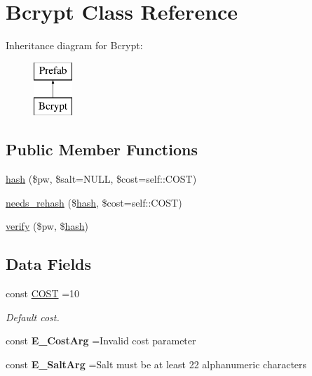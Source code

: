 \hypertarget{class_bcrypt}{}\section{Bcrypt Class Reference}
\label{class_bcrypt}
Inheritance diagram for Bcrypt\+:\begin{figure}[H]
\begin{center}
\leavevmode
\includegraphics[height=2.000000cm]{class_bcrypt}
\end{center}
\end{figure}
\subsection*{Public Member Functions}
\begin{DoxyCompactItemize}
\item 
\hyperlink{class_bcrypt_a027c5d961c1d96ac0fa2a0fcc4af1e71}{hash} (\$pw, \$salt=N\+U\+LL, \$cost=self\+::\+C\+O\+ST)
\item 
\hyperlink{class_bcrypt_a426e49c6c92d63e97240374a30e44989}{needs\+\_\+rehash} (\$\hyperlink{class_bcrypt_a027c5d961c1d96ac0fa2a0fcc4af1e71}{hash}, \$cost=self\+::\+C\+O\+ST)
\item 
\hyperlink{class_bcrypt_a88aa522c359b8f4adff496b507df9864}{verify} (\$pw, \$\hyperlink{class_bcrypt_a027c5d961c1d96ac0fa2a0fcc4af1e71}{hash})
\end{DoxyCompactItemize}
\subsection*{Data Fields}
\begin{DoxyCompactItemize}
\item 
\hypertarget{class_bcrypt_a086e0e15867645a7a8cf461bf8ce1e0c}{}\label{class_bcrypt_a086e0e15867645a7a8cf461bf8ce1e0c} 
const \hyperlink{class_bcrypt_a086e0e15867645a7a8cf461bf8ce1e0c}{C\+O\+ST} =10
\begin{DoxyCompactList}\small\item\em Default cost. \end{DoxyCompactList}\end{DoxyCompactItemize}
{\bf }\par
\begin{DoxyCompactItemize}
\item 
\hypertarget{class_bcrypt_a8713f533d972d7d3f0637941061f9b8a}{}\label{class_bcrypt_a8713f533d972d7d3f0637941061f9b8a} 
const {\bfseries E\+\_\+\+Cost\+Arg} =\textquotesingle{}Invalid cost parameter\textquotesingle{}
\item 
\hypertarget{class_bcrypt_aaea1f538f70ff2c05db136dd0fe74db4}{}\label{class_bcrypt_aaea1f538f70ff2c05db136dd0fe74db4} 
const {\bfseries E\+\_\+\+Salt\+Arg} =\textquotesingle{}Salt must be at least 22 alphanumeric characters\textquotesingle{}
\end{DoxyCompactItemize}

